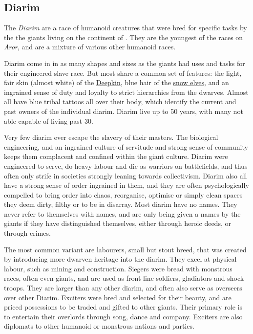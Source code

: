 \subsection{Diarim}
\label{sec:Diarim}


The \emph{Diarim} are a race of humanoid creatures that were bred for specific
tasks by the the giants living on the continent of . They
are the youngest of the races on \emph{Aror}, and are a mixture of various
other humanoid races.

Diarim come in in as many shapes and sizes as the giants had uses and tasks
for their engineered slave race. But most share a common set of features: the
light, fair skin (almost white) of the \hyperref[sec:Deepkin]{Deepkin}, blue
hair of the \hyperref[sec:Snow Elves]{snow elves}, and an ingrained sense of
duty and loyalty to strict hierarchies from the dwarves. Almost all have blue
tribal tattoos all over their body, which identify the current and past owners
of the individual diarim. Diarim live up to 50 years, with many not able capable
of living past 30.

Very few diarim ever escape the slavery of their masters. The biological
engineering, and an ingrained culture of servitude and strong sense of
community keeps them complacent and confined within the giant culture. Diarim
were engineered to serve, do heavy labour and die as warriors on battlefields,
and thus often only strife in societies strongly leaning towards
collectivism. Diarim also all have a strong sense of order ingrained in them,
and they are often psychologically compelled to bring order into chaos,
reorganise, optimise or simply clean spaces they deem dirty, filthy or to be
in disarray. Most diarim have no names. They never refer to themselves with
names, and are only being given a names by the giants if they have
distinguished themselves, either through heroic deeds, or through crimes.

The most common variant are labourers, small but stout breed, that was created
by introducing more dwarven heritage into the diarim. They excel at physical
labour, such as mining and construction. Siegers were bread with monstrous
races, often even giants, and are used as front line soldiers, gladiators and
shock troops. They are larger than any other diarim, and often also serve as
overseers over other Diarim. Exciters were bred and selected for their beauty,
and are priced possessions to be traded and gifted to other giants. Their
primary role is to entertain their overlords through song, dance and company.
Exciters are also diplomats to other humanoid or monstrous nations and parties.

